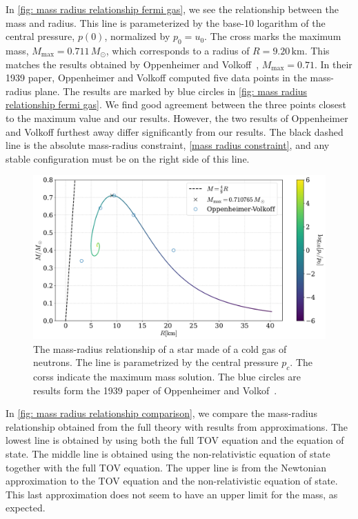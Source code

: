 In \autoref{fig: mass radius relationship fermi gas}, we see the relationship between the mass and radius.
This line is parameterized by the base-10 logarithm of the central pressure, $p(0)$, normalized by $p_0 = u_0$.
The cross marks the maximum mass, $M_\mathrm{max} = 0.711 \, M_\odot$, which corresponds to a radius of $R = 9.20 \, \mathrm{km}$.
This matches the results obtained by Oppenheimer and Volkoff~\cite{oppenheimerMassiveNeutronCores1939}, $M_\mathrm{max} = 0.71$.
In their 1939 paper, Oppenheimer and Volkoff computed five data points in the mass-radius plane.
The results are marked by blue circles in \autoref{fig: mass radius relationship fermi gas}.
We find good agreement between the three points closest to the maximum value and our results.
However, the two results of Oppenheimer and Volkoff furthest away differ significantly from our results.
The black dashed line is the absolute mass-radius constraint, \autoref{mass radius constraint}, and any stable configuration must be on the right side of this line.


\begin{figure}[h]
    \centering
    \includegraphics[width=\textwidth]{../scripts/figurer/mass_radius_neutron.pdf}
    \caption{The mass-radius relationship of a star made of a cold gas of neutrons. The line is parametrized by the central pressure $p_c$. The corss indicate the maximum mass solution. The blue circles are results form the 1939 paper of Oppenheimer and Volkof~\autocite{oppenheimerMassiveNeutronCores1939}.}
    \label{fig: mass radius relationship fermi gas}
\end{figure}


In \autoref{fig: mass radius relationship comparison}, we compare the mass-radius relationship obtained from the full theory with results from approximations.
The lowest line is obtained by using both the full TOV equation and the equation of state.
The middle line is obtained using the non-relativistic equation of state together with the full TOV equation.
The upper line is from the Newtonian approximation to the TOV equation and the non-relativistic equation of state.
This last approximation does not seem to have an upper limit for the mass, as expected.


